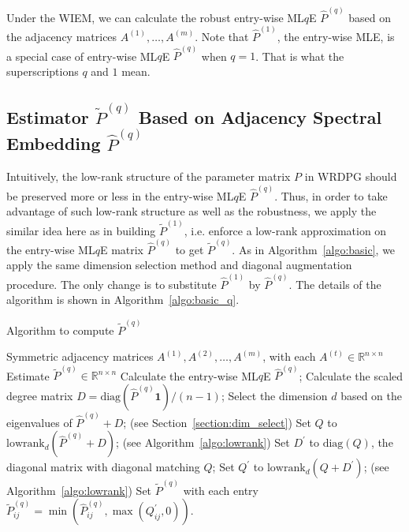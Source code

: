 \documentclass[a4paper]{article}
\renewcommand{\hat}{\widehat}
\begin{document}
Under the WIEM, we can calculate the robust entry-wise ML$q$E $\hat{P}^{(q)}$ based on the adjacency matrices $A^{(1)}, \dotsc, A^{(m)}$. Note that $\hat{P}^{(1)}$, the entry-wise MLE, is a special case of entry-wise ML$q$E $\hat{P}^{(q)}$ when $q = 1$. That is what the superscriptions $q$ and $1$ mean.



\subsection{Estimator $\widetilde{P}^{(q)}$ Based on Adjacency Spectral Embedding $\hat{P}^{(q)}$}

Intuitively, the low-rank structure of the parameter matrix $P$ in WRDPG should be preserved more or less in the entry-wise ML$q$E $\hat{P}^{(q)}$. Thus, in order to take advantage of such low-rank structure as well as the robustness, we apply the similar idea here as in building $\widetilde{P}^{(1)}$, i.e. enforce a low-rank approximation on the entry-wise ML$q$E matrix $\hat{P}^{(q)}$ to get $\widetilde{P}^{(q)}$. As in Algorithm~\ref{algo:basic}, we apply the same dimension selection method and diagonal augmentation procedure. The only change is to substitute $\hat{P}^{(1)}$ by $\hat{P}^{(q)}$. The details of the algorithm is shown in Algorithm~\ref{algo:basic_q}.

\begin{algorithm}[H]
\caption{Algorithm to compute $\widetilde{P}^{(q)}$}
\label{algo:basic_q}
\begin{algorithmic}[1]
\REQUIRE Symmetric adjacency matrices $A^{(1)}, A^{(2)}, \dotsc, A^{(m)}$, with each $A^{(t)} \in \mathbb{R}^{n \times n}$
\ENSURE Estimate $\widetilde{P}^{(q)} \in \mathbb{R}^{n \times n}$
\STATE Calculate the entry-wise ML$q$E $\hat{P}^{(q)}$;
\STATE Calculate the scaled degree matrix $D = \mathrm{diag}(\hat{P}^{(q)} \bm{1})/(n-1)$;
\STATE Select the dimension $d$ based on the eigenvalues of $\hat{P}^{(q)} + D$; (see Section~\ref{section:dim_select})
\STATE Set $Q$ to $\mathrm{lowrank}_d(\hat{P}^{(q)} + D)$; (see Algorithm~\ref{algo:lowrank})
\STATE Set $D^{\prime}$ to $ \mathrm{diag}(Q)$, the diagonal matrix with diagonal matching $Q$; 
\STATE Set $Q^{\prime}$ to $\mathrm{lowrank}_d(Q + D^{\prime})$; (see Algorithm~\ref{algo:lowrank})
\STATE Set $\widetilde{P}^{(q)}$ with each entry $\widetilde{P}^{(q)}_{ij} = \min( \hat{P}^{(q)}_{ij}, \max(Q^{\prime}_{ij}, 0))$.
\end{algorithmic}
\end{algorithm}
\end{document}
